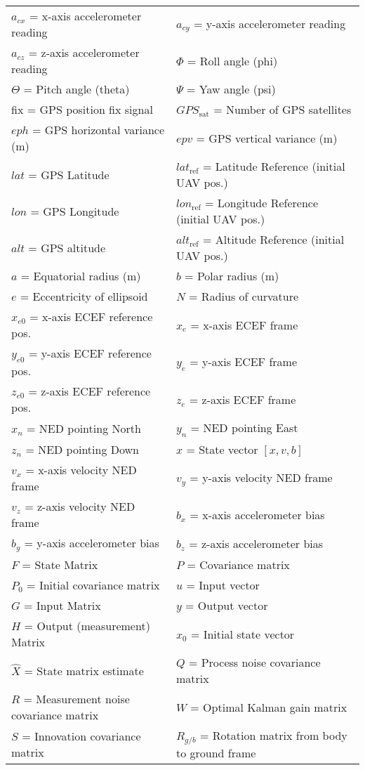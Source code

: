 \begin{table}[h!]
\centering
\begin{tabular}{>{\raggedright\arraybackslash}p{8cm} p{8cm}}
\midrule
$a_{cx}$ = x-axis accelerometer reading & $a_{cy}$ = y-axis accelerometer reading \\
$a_{cz}$ = z-axis accelerometer reading & $\Phi$ = Roll angle (phi) \\
$\Theta$ = Pitch angle (theta) & $\Psi$ = Yaw angle (psi) \\
fix = GPS position fix signal & $GPS_{\text{sat}}$ = Number of GPS satellites \\
$eph$ = GPS horizontal variance (m) & $epv$ = GPS vertical variance (m) \\
$lat$ = GPS Latitude & $lat_{\text{ref}}$ = Latitude Reference (initial UAV pos.) \\
$lon$ = GPS Longitude & $lon_{\text{ref}}$ = Longitude Reference (initial UAV pos.) \\
$alt$ = GPS altitude & $alt_{\text{ref}}$ = Altitude Reference (initial UAV pos.) \\
$a$ = Equatorial radius (m) & $b$ = Polar radius (m) \\
$e$ = Eccentricity of ellipsoid & $N$ = Radius of curvature \\
$x_{e0}$ = x-axis ECEF reference pos. & $x_e$ = x-axis ECEF frame \\
$y_{e0}$ = y-axis ECEF reference pos. & $y_e$ = y-axis ECEF frame \\
$z_{e0}$ = z-axis ECEF reference pos. & $z_e$ = z-axis ECEF frame \\
$x_n$ = NED pointing North & $y_n$ = NED pointing East \\
$z_n$ = NED pointing Down & $x$ = State vector $[x,v,b]$ \\
$v_x$ = x-axis velocity NED frame & $v_y$ = y-axis velocity NED frame \\
$v_z$ = z-axis velocity NED frame & $b_x$ = x-axis accelerometer bias \\
$b_y$ = y-axis accelerometer bias & $b_z$ = z-axis accelerometer bias \\
$F$ = State Matrix & $P$ = Covariance matrix \\
$P_0$ = Initial covariance matrix & $u$ = Input vector \\
$G$ = Input Matrix & $y$ = Output vector \\
$H$ = Output (measurement) Matrix & $x_0$ = Initial state vector \\
$\hat{X}$ = State matrix estimate & $Q$ = Process noise covariance matrix \\
$R$ = Measurement noise covariance matrix & $W$ = Optimal Kalman gain matrix \\
$S$ = Innovation covariance matrix & $R_{g/b}$ = Rotation matrix from body to ground frame \\
\bottomrule
\end{tabular}
\end{table}